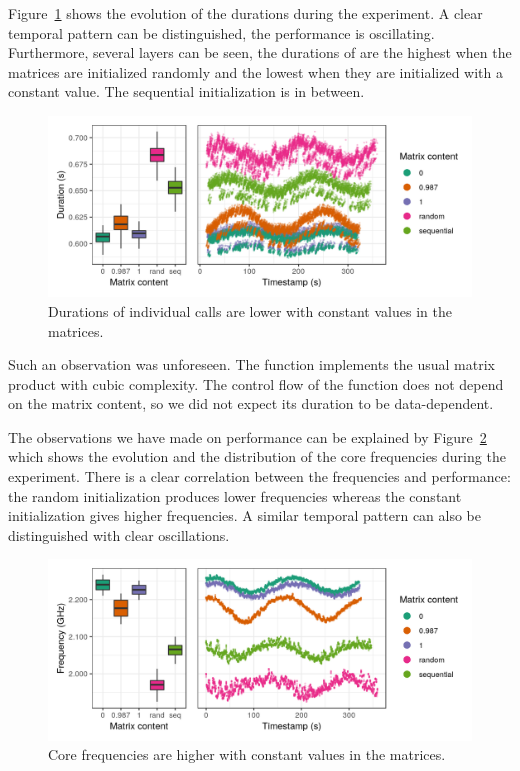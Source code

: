         Figure~\ref{fig:exp:bit-flips:method-perf} shows the evolution of the \dgemm durations during the experiment.
        A clear temporal pattern can be distinguished, the performance is oscillating.  Furthermore, several layers can
        be seen, the durations of \dgemm are the highest when the matrices are initialized randomly and the
        lowest when they are initialized with a constant value. The sequential initialization is in between.

        \begin{figure}[htbp]
            \centering
            \includegraphics[width=\linewidth]{img/experiment/bit-flips/generation_method_perf.png}
            \caption{\label{fig:exp:bit-flips:method-perf}
            Durations of individual \dgemm calls are lower with constant values in the matrices.}
        \end{figure}

        Such an observation was unforeseen. The function \dgemm implements the usual matrix product with cubic
        complexity. The control flow of the function does not depend on the matrix content, so we did not expect its
        duration to be data-dependent.

        The observations we have made on \dgemm performance can be explained by
        Figure~\ref{fig:exp:bit-flips:method-freq} which shows the evolution and the distribution of the core
        frequencies during the experiment. There is a clear correlation between the frequencies and \dgemm
        performance: the random initialization produces lower frequencies whereas the constant initialization gives
        higher frequencies. A similar temporal pattern can also be distinguished with clear oscillations.

        \begin{figure}[htbp]
            \centering
            \includegraphics[width=\linewidth]{img/experiment/bit-flips/generation_method_freq.png}
            \caption{\label{fig:exp:bit-flips:method-freq}
            Core frequencies are higher with constant values in the matrices.}
        \end{figure}

